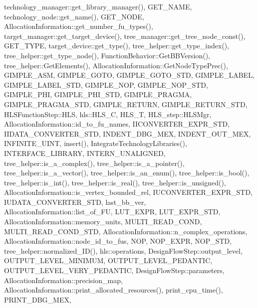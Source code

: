 technology\+\_\+manager\+::get\+\_\+library\+\_\+manager(), G\+E\+T\+\_\+\+N\+A\+ME, technology\+\_\+node\+::get\+\_\+name(), G\+E\+T\+\_\+\+N\+O\+DE, Allocation\+Information\+::get\+\_\+number\+\_\+fu\+\_\+types(), target\+\_\+manager\+::get\+\_\+target\+\_\+device(), tree\+\_\+manager\+::get\+\_\+tree\+\_\+node\+\_\+const(), G\+E\+T\+\_\+\+T\+Y\+PE, target\+\_\+device\+::get\+\_\+type(), tree\+\_\+helper\+::get\+\_\+type\+\_\+index(), tree\+\_\+helper\+::get\+\_\+type\+\_\+node(), Function\+Behavior\+::\+Get\+B\+B\+Version(), tree\+\_\+helper\+::\+Get\+Elements(), Allocation\+Information\+::\+Get\+Node\+Type\+Prec(), G\+I\+M\+P\+L\+E\+\_\+\+A\+SM, G\+I\+M\+P\+L\+E\+\_\+\+G\+O\+TO, G\+I\+M\+P\+L\+E\+\_\+\+G\+O\+T\+O\+\_\+\+S\+TD, G\+I\+M\+P\+L\+E\+\_\+\+L\+A\+B\+EL, G\+I\+M\+P\+L\+E\+\_\+\+L\+A\+B\+E\+L\+\_\+\+S\+TD, G\+I\+M\+P\+L\+E\+\_\+\+N\+OP, G\+I\+M\+P\+L\+E\+\_\+\+N\+O\+P\+\_\+\+S\+TD, G\+I\+M\+P\+L\+E\+\_\+\+P\+HI, G\+I\+M\+P\+L\+E\+\_\+\+P\+H\+I\+\_\+\+S\+TD, G\+I\+M\+P\+L\+E\+\_\+\+P\+R\+A\+G\+MA, G\+I\+M\+P\+L\+E\+\_\+\+P\+R\+A\+G\+M\+A\+\_\+\+S\+TD, G\+I\+M\+P\+L\+E\+\_\+\+R\+E\+T\+U\+RN, G\+I\+M\+P\+L\+E\+\_\+\+R\+E\+T\+U\+R\+N\+\_\+\+S\+TD, H\+L\+S\+Function\+Step\+::\+H\+LS, hls\+::\+H\+L\+S\+\_\+C, H\+L\+S\+\_\+T, H\+L\+S\+\_\+step\+::\+H\+L\+S\+Mgr, Allocation\+Information\+::id\+\_\+to\+\_\+fu\+\_\+names, I\+I\+C\+O\+N\+V\+E\+R\+T\+E\+R\+\_\+\+E\+X\+P\+R\+\_\+\+S\+TD, I\+I\+D\+A\+T\+A\+\_\+\+C\+O\+N\+V\+E\+R\+T\+E\+R\+\_\+\+S\+TD, I\+N\+D\+E\+N\+T\+\_\+\+D\+B\+G\+\_\+\+M\+EX, I\+N\+D\+E\+N\+T\+\_\+\+O\+U\+T\+\_\+\+M\+EX, I\+N\+F\+I\+N\+I\+T\+E\+\_\+\+U\+I\+NT, insert(), Integrate\+Technology\+Libraries(), I\+N\+T\+E\+R\+F\+A\+C\+E\+\_\+\+L\+I\+B\+R\+A\+RY, I\+N\+T\+E\+R\+N\+\_\+\+U\+N\+A\+L\+I\+G\+N\+ED, tree\+\_\+helper\+::is\+\_\+a\+\_\+complex(), tree\+\_\+helper\+::is\+\_\+a\+\_\+pointer(), tree\+\_\+helper\+::is\+\_\+a\+\_\+vector(), tree\+\_\+helper\+::is\+\_\+an\+\_\+enum(), tree\+\_\+helper\+::is\+\_\+bool(), tree\+\_\+helper\+::is\+\_\+int(), tree\+\_\+helper\+::is\+\_\+real(), tree\+\_\+helper\+::is\+\_\+unsigned(), Allocation\+Information\+::is\+\_\+vertex\+\_\+bounded\+\_\+rel, I\+U\+C\+O\+N\+V\+E\+R\+T\+E\+R\+\_\+\+E\+X\+P\+R\+\_\+\+S\+TD, I\+U\+D\+A\+T\+A\+\_\+\+C\+O\+N\+V\+E\+R\+T\+E\+R\+\_\+\+S\+TD, last\+\_\+bb\+\_\+ver, Allocation\+Information\+::list\+\_\+of\+\_\+\+FU, L\+U\+T\+\_\+\+E\+X\+PR, L\+U\+T\+\_\+\+E\+X\+P\+R\+\_\+\+S\+TD, Allocation\+Information\+::memory\+\_\+units, M\+U\+L\+T\+I\+\_\+\+R\+E\+A\+D\+\_\+\+C\+O\+ND, M\+U\+L\+T\+I\+\_\+\+R\+E\+A\+D\+\_\+\+C\+O\+N\+D\+\_\+\+S\+TD, Allocation\+Information\+::n\+\_\+complex\+\_\+operations, Allocation\+Information\+::node\+\_\+id\+\_\+to\+\_\+fus, N\+OP, N\+O\+P\+\_\+\+E\+X\+PR, N\+O\+P\+\_\+\+S\+TD, tree\+\_\+helper\+::normalized\+\_\+\+I\+D(), hls\+::operations, Design\+Flow\+Step\+::output\+\_\+level, O\+U\+T\+P\+U\+T\+\_\+\+L\+E\+V\+E\+L\+\_\+\+M\+I\+N\+I\+M\+UM, O\+U\+T\+P\+U\+T\+\_\+\+L\+E\+V\+E\+L\+\_\+\+P\+E\+D\+A\+N\+T\+IC, O\+U\+T\+P\+U\+T\+\_\+\+L\+E\+V\+E\+L\+\_\+\+V\+E\+R\+Y\+\_\+\+P\+E\+D\+A\+N\+T\+IC, Design\+Flow\+Step\+::parameters, Allocation\+Information\+::precision\+\_\+map, Allocation\+Information\+::print\+\_\+allocated\+\_\+resources(), print\+\_\+cpu\+\_\+time(), P\+R\+I\+N\+T\+\_\+\+D\+B\+G\+\_\+\+M\+EX, 